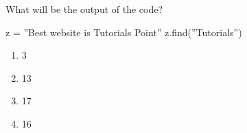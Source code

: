 \question
What will be the output of the code?

z = ''Best website is Tutorials Point''
z.find(''Tutorials'')
\begin{enumerate}
\item 3
\item 13
\item 17
\item 16
\end{enumerate}

